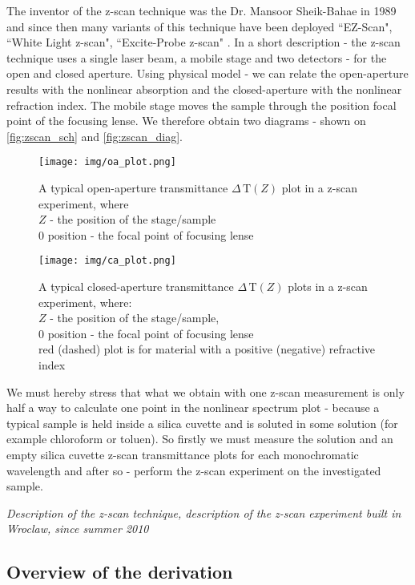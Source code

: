 \documentclass[12pt,twoside,a4paper]{article}
\numberwithin{equation}{subsection}
\numberwithin{figure}{subsection}
\begin{document}
The inventor of the z-scan technique was the Dr. Mansoor Sheik-Bahae in 1989 \cite{bahae_sensitive} and since then many variants of this
technique have been deployed ``EZ-Scan", ``White Light z-scan", ``Excite-Probe z-scan" \cite{newport_application}. In a short
description - the z-scan technique uses a single laser beam, a mobile stage and two detectors - for the open and closed aperture.
Using physical model - we can relate the open-aperture results with the nonlinear absorption and the closed-aperture with the
nonlinear refraction index. The mobile stage moves the sample through the position focal point of the focusing lense. We therefore obtain
two diagrams - shown on \ref{fig:zscan_sch} and \ref{fig:zscan_diag}.


\begin{figure}
  \texttt{[image: img/oa\_plot.png]}
  \caption{A typical open-aperture transmittance $\Delta \,\mathrm{T}(Z)$ plot in a z-scan experiment, where \\ 
  $Z$ - the position of the stage/sample \\ 
  $0$ position - the focal point of focusing lense 
  \label{fig:oa_plot}}
\end{figure}


\begin{figure}
  \texttt{[image: img/ca\_plot.png]}
  \caption{A typical closed-aperture transmittance $\Delta \,\mathrm{T}(Z)$ plots in a z-scan experiment, where: \\  
    $Z$ - the position of the stage/sample, \\
    $0$ position - the focal point of focusing lense \\
    red (dashed) plot is for material with a positive (negative) refractive index
    \label{fig:ca_plot}}
\end{figure}

We must hereby stress that what we obtain with one z-scan measurement is only half a way to calculate one point in the nonlinear
spectrum plot - because a typical sample is held inside a silica cuvette and is soluted in some solution (for example chloroform or
toluen). So firstly we must measure the solution and an empty silica cuvette z-scan transmittance plots for each monochromatic
wavelength and after so - perform the z-scan experiment on the investigated sample. 

\textit{Description of the z-scan technique, description of the z-scan experiment built in Wroclaw, since summer 2010}

\subsection{Overview of the derivation} \label{chap:zscan_derivation}
\end{document}
